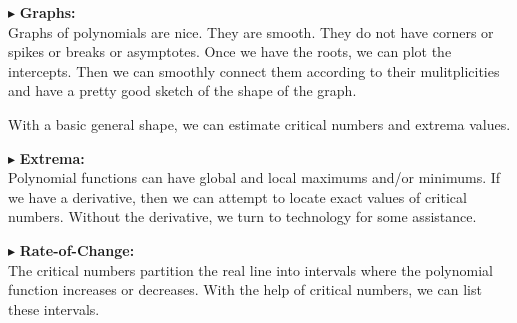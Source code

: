 \documentclass{ximera}
\begin{document}
$\blacktriangleright$ \textbf{\textcolor{red!10!blue!90!}{Graphs:}} \\ 
Graphs of polynomials are nice.  They are smooth.  They do not have corners or spikes or breaks or asymptotes. Once we have the roots, we can plot the intercepts.  Then we can smoothly connect them according to their mulitplicities and have a pretty good sketch of the shape of the graph.

With a basic general shape, we can estimate critical numbers and extrema values.




$\blacktriangleright$  \textbf{\textcolor{red!10!blue!90!}{Extrema:}} \\ 
Polynomial functions can have global and local maximums and/or minimums. If we have a derivative, then we can attempt to locate exact values of critical numbers.  Without the derivative, we turn to technology for some assistance.




$\blacktriangleright$ \textbf{\textcolor{red!10!blue!90!}{Rate-of-Change:}} \\ 
The critical numbers partition the real line into intervals where the polynomial function increases or decreases.  With the help of critical numbers, we can list these intervals.
\end{document}
